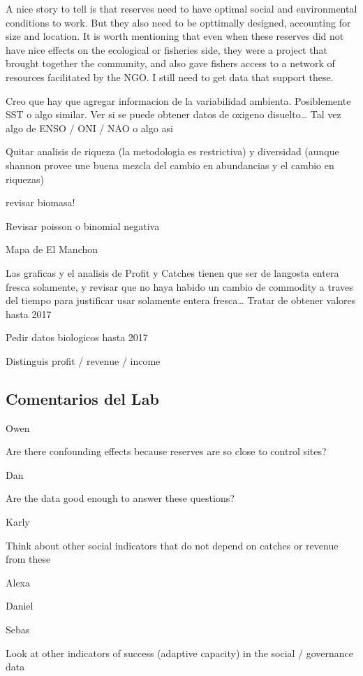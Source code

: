 \documentclass{frontiersSCNS}
\theoremstyle{definition}
\theoremstyle{definition}
\theoremstyle{definition}
\theoremstyle{remark}
\begin{document}
A nice story to tell is that reserves need to have optimal social and
environmental conditions to work. But they also need to be opttimally
designed, accounting for size and location. It is worth mentioning that
even when these reserves did not have nice effects on the ecological or
fisheries side, they were a project that brought together the community,
and also gave fishers access to a network of resources facilitated by
the NGO. I still need to get data that support these.

Creo que hay que agregar informacion de la variabilidad ambienta.
Posiblemente SST o algo similar. Ver si se puede obtener datos de
oxigeno disuelto\ldots{} Tal vez algo de ENSO / ONI / NAO o algo asi

Quitar analisis de riqueza (la metodologia es restrictiva) y diversidad
(aunque shannon provee une buena mezcla del cambio en abundancias y el
cambio en riquezas)

revisar biomasa!

Revisar poisson o binomial negativa

Mapa de El Manchon

Las graficas y el analisis de Profit y Catches tienen que ser de
langosta entera fresca solamente, y revisar que no haya habido un cambio
de commodity a traves del tiempo para justificar usar solamente entera
fresca\ldots{} Tratar de obtener valores hasta 2017

Pedir datos biologicos hasta 2017

Distinguis profit / revenue / income

\subsection{Comentarios del Lab}\label{comentarios-del-lab}

Owen

Are there confounding effects because reserves are so close to control
sites?

Dan

Are the data good enough to answer these questions?

Karly

Think about other social indicators that do not depend on catches or
revenue from these

Alexa

Daniel

Sebas

Look at other indicators of success (adaptive capacity) in the social /
governance data
\end{document}
